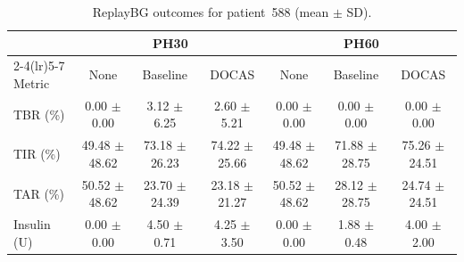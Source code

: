 \begin{table}[!htbp]
\caption{ReplayBG outcomes for patient~588 (mean $\pm$ SD).}
\label{tab:replay}
\begin{tabular*}{\tblwidth}{@{\extracolsep{\fill}}lcccccc@{}}
\toprule
 & \multicolumn{3}{c}{PH30} & \multicolumn{3}{c}{PH60} \\
\cmidrule(lr){2-4}\cmidrule(lr){5-7}
Metric & None & Baseline & DOCAS & None & Baseline & DOCAS \\
\midrule
TBR (\%) & 0.00 $\pm$ 0.00 & 3.12 $\pm$ 6.25 & 2.60 $\pm$ 5.21 & 0.00 $\pm$ 0.00 & 0.00 $\pm$ 0.00 & 0.00 $\pm$ 0.00 \\
TIR (\%) & 49.48 $\pm$ 48.62 & 73.18 $\pm$ 26.23 & 74.22 $\pm$ 25.66 & 49.48 $\pm$ 48.62 & 71.88 $\pm$ 28.75 & 75.26 $\pm$ 24.51 \\
TAR (\%) & 50.52 $\pm$ 48.62 & 23.70 $\pm$ 24.39 & 23.18 $\pm$ 21.27 & 50.52 $\pm$ 48.62 & 28.12 $\pm$ 28.75 & 24.74 $\pm$ 24.51 \\
Insulin (U) & 0.00 $\pm$ 0.00 & 4.50 $\pm$ 0.71 & 4.25 $\pm$ 3.50 & 0.00 $\pm$ 0.00 & 1.88 $\pm$ 0.48 & 4.00 $\pm$ 2.00 \\
\bottomrule
\end{tabular*}
\end{table}
